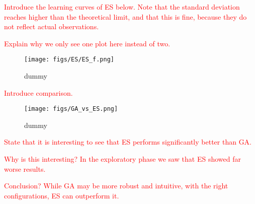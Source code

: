 \documentclass{article}
\newcommand{\todo}[1]{\textcolor{red}{#1}}
\begin{document}




\todo{Introduce the learning curves of ES below. Note that the standard deviation reaches higher than the theoretical limit, and that this is fine, because they do not reflect actual observations.}

\todo{Explain why we only see one plot here instead of two.}

\begin{figure*}[htbp]
    \centering
    \texttt{[image: figs/ES/ES\_f.png]}
    \captionsetup{width=.75\textwidth}
    \caption{dummy}
    \label{fig:ES_f}
\end{figure*}





\newpage

\todo{Introduce comparison.}

\begin{figure*}[htbp]
    \centering
    \texttt{[image: figs/GA\_vs\_ES.png]}
    \captionsetup{width=.75\textwidth}
    \caption{dummy}
    \label{fig:GA_vs_ES}
\end{figure*}

\todo{State that it is interesting to see that ES performs significantly better than GA.}

\todo{Why is this interesting? In the exploratory phase we saw that ES showed far worse results.}

\todo{Conclusion? While GA may be more robust and intuitive, with the right configurations, ES can outperform it.}

\newpage



\end{document}
